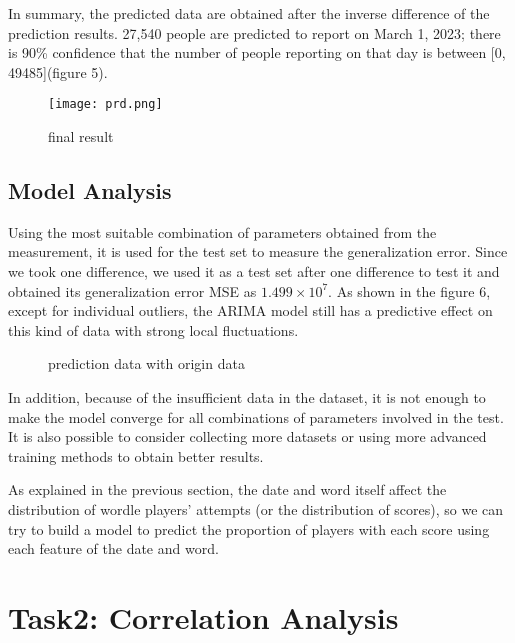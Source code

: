 \documentclass[12pt]{article}  %
\begin{document}
In summary, the predicted data are obtained after the inverse difference of the prediction results. 27,540 people are predicted to report on March 1, 2023; there is 90\% confidence that the number of people reporting on that day is between [0, 49485](figure 5).

\begin{figure}[H]
	\centering
	\texttt{[image: prd.png]}
	\caption{final result}
	\label{img5}
\end{figure}

\subsection{Model Analysis}
Using the most suitable combination of parameters obtained from the measurement, it is used for the test set to measure the generalization error. Since we took one difference, we used it as a test set after one difference to test it and obtained its generalization error MSE as $1.499\times 10^7$. As shown in the figure 6, except for individual outliers, the ARIMA model still has a predictive effect on this kind of data with strong local fluctuations.
\begin{figure}[H]
	\centering    
	\caption{prediction data with origin data}		%
	\label{img34}									%
\end{figure}

In addition, because of the insufficient data in the dataset, it is not enough to make the model converge for all combinations of parameters involved in the test. It is also possible to consider collecting more datasets or using more advanced training methods to obtain better results.

As explained in the previous section, the date and word itself affect the distribution of wordle players' attempts (or the distribution of scores), so we can try to build a model to predict the proportion of players with each score using each feature of the date and word.

\section{Task2: Correlation Analysis}
\end{document}
